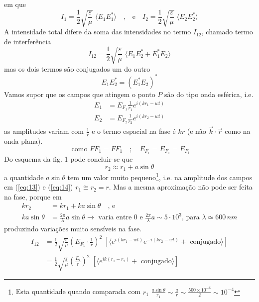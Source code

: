 \documentclass[a4paper,12pt]{article}
\begin{document}
em que 
\begin{equation}
	\label{eq:10} I_1 =\frac{1}{2}\sqrt{\frac{ \varepsilon}{\mu}} \;  \langle E_{1} E^*_{1} \rangle \quad \text{,} \quad \text{e} \quad  I_2 =\frac{1}{2}\sqrt{\frac{ \varepsilon}{\mu}} \; \langle E_2 E^*_2 \rangle
\end{equation}
A intensidade total difere da soma das intensidades no termo $I_{12} $, chamado termo de interferência 
\begin{equation}
	\label{eq:11} I_{12} =\frac{1}{2}\sqrt{\frac{ \varepsilon}{\mu}} \; \langle E_1 E^*_2 + E^*_1 E_2 \rangle 
\end{equation}
mas os dois termos são conjugados um do outro 
\begin{equation}
	\label{eq:12} E_1 E^*_2 = (E^*_1 E_2)^* 
\end{equation}
Vamos supor que os campos que atingem o ponto $P$ são do tipo onda esférica, i.e. 
\begin{align}
	E_1 &= E_{F_1} \frac{1}{r_1} e^{ i (k r_1 -wt )} \label{eq:13}\\
	E_2 &= E_{F_2} \frac{1}{r_2} e^{ i (k r_2 -wt )} \label{eq:14} 
\end{align}
as amplitudes variam com $\frac{1}{r}$ e o termo espacial na fase é $k r$ (e não $ \vec{k} \cdot \vec{r} $ como na onda plana). 
\begin{equation}
	\label{eq:15} \text{ como } F F_1 = F F_1 \quad ; \quad E_{F_1} = E_{F_1} = E_{F_i} 
\end{equation}
Do esquema da fig. 1 pode concluir-se que 
\begin{equation}
	\label{eq:16} r_2 \approx r_1 + a \sin \theta 
\end{equation}
a quantidade $ a \sin \theta $ tem um valor muito pequeno\footnote{Esta quantidade quando comparada com $ r_1$ \; $ \frac{a \sin \theta }{r_1 } \sim \frac{a}{r } \sim \frac{ 500 \times 10^{-6} }{2 } \sim 10^{-4}$},
i.e. na amplitude dos campos em (\ref{eq:13}) e (\ref{eq:14}) $ r_1 \cong r_2 = r$. 
Mas a mesma aproximação não pode ser feita na fase, porque em 
\begin{align}
	k r_2 &= k r_1 +k a \sin \theta \quad \text{, e } \nonumber \\
	k a \sin \theta &= \frac{ 2 \pi }{\lambda } a \sin \theta  \rightarrow \text{ varia entre } 0 \text{ e } \frac{ 2 \pi}{\lambda} a \sim 5 \cdot 10^{3} \text{, para }  \lambda \simeq 600\,nm  \nonumber 
\end{align}
produzindo variações muito sensíveis na fase. 
\begin{align}
	\label{eq:17} I_{12} &=\frac{1}{2}\sqrt{\frac{ \varepsilon}{\mu}} \left(E_{F_1} \cdot \frac{1}{r }\right)^2 \; \left[ \langle e^{ i (k r_1 -wt )} e^{ -i (k r_2 -wt ) } + \text{ conjugado} \rangle \right] \nonumber \\
	&= \frac{1}{2}\sqrt{\frac{ \varepsilon}{\mu}} \left(\frac{E_i}{r }\right)^2 \; \left[ \langle e^{ i k (r_1 - r_2) } + \text{ conjugado} \rangle \right] 
\end{align}
\end{document}

